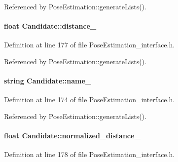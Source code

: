 Referenced by Pose\-Estimation\-::generate\-Lists().

\hypertarget{classCandidate_a4c57f77041f7729849ff4acf86071abf}{
\paragraph[{distance\-\_\-}]{\setlength{\rightskip}{0pt plus 5cm}float Candidate\-::distance\-\_\-\hspace{0.3cm}{\ttfamily [private]}}}\label{classCandidate_a4c57f77041f7729849ff4acf86071abf}


Definition at line 177 of file Pose\-Estimation\-\_\-interface.\-h.



Referenced by Pose\-Estimation\-::generate\-Lists().

\hypertarget{classCandidate_a2d2bca2f29137c8d341202d4d4e3aa04}{
\paragraph[{name\-\_\-}]{\setlength{\rightskip}{0pt plus 5cm}string Candidate\-::name\-\_\-\hspace{0.3cm}{\ttfamily [private]}}}\label{classCandidate_a2d2bca2f29137c8d341202d4d4e3aa04}


Definition at line 174 of file Pose\-Estimation\-\_\-interface.\-h.



Referenced by Pose\-Estimation\-::generate\-Lists().

\hypertarget{classCandidate_a03bdc19e0ee68d095ef402c1ae8857e6}{
\paragraph[{normalized\-\_\-distance\-\_\-}]{\setlength{\rightskip}{0pt plus 5cm}float Candidate\-::normalized\-\_\-distance\-\_\-\hspace{0.3cm}{\ttfamily [private]}}}\label{classCandidate_a03bdc19e0ee68d095ef402c1ae8857e6}


Definition at line 178 of file Pose\-Estimation\-\_\-interface.\-h.




